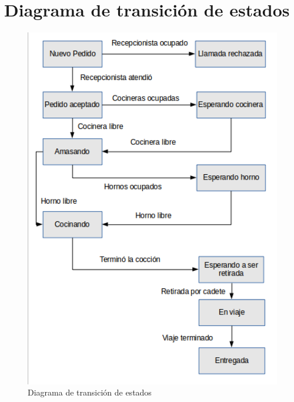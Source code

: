 \documentclass[11pt,spanish,a4paper,openany,notitlepage]{article}
\begin{document}
\newpage

\section{Diagrama de transición de estados}

\begin{figure}[H]
\begin{center}
\includegraphics[width=350pt]{./informe/diagrama-estados-pizza.png}
\caption{Diagrama de transición de estados}
\end{center}
\end{figure}
\end{document}
